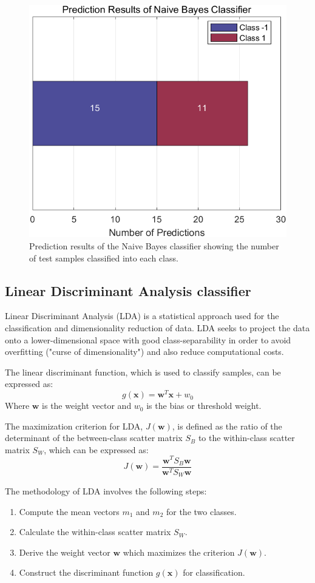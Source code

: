 \documentclass[12pt, onecolumn]{article}
\begin{document}
\begin{figure}[htbp]
\centering
\includegraphics[width=0.8\linewidth]{Naive Bayes.png}
\caption{Prediction results of the Naive Bayes classifier showing the number of test samples classified into each class.}
\label{fig:naive_bayes_results}
\end{figure}



\subsection{Linear Discriminant Analysis classifier}
Linear Discriminant Analysis (LDA) is a statistical approach used for the classification and dimensionality reduction of data. LDA seeks to project the data onto a lower-dimensional space with good class-separability in order to avoid overfitting ("curse of dimensionality") and also reduce computational costs.

The linear discriminant function, which is used to classify samples, can be expressed as:
\[
g(\mathbf{x}) = \mathbf{w}^T\mathbf{x} + w_0
\]
Where \( \mathbf{w} \) is the weight vector and \( w_0 \) is the bias or threshold weight.

The maximization criterion for LDA, \( J(\mathbf{w}) \), is defined as the ratio of the determinant of the between-class scatter matrix \( S_B \) to the within-class scatter matrix \( S_W \), which can be expressed as:
\[
J(\mathbf{w}) = \frac{\mathbf{w}^T S_B \mathbf{w}}{\mathbf{w}^T S_W \mathbf{w}}
\]

The methodology of LDA involves the following steps:

\begin{enumerate}
    \item Compute the mean vectors \( m_1 \) and \( m_2 \) for the two classes.
    \item Calculate the within-class scatter matrix \( S_W \).
    \item Derive the weight vector \( \mathbf{w} \) which maximizes the criterion \( J(\mathbf{w}) \).
    \item Construct the discriminant function \( g(\mathbf{x}) \) for classification.
\end{enumerate}
\end{document}
